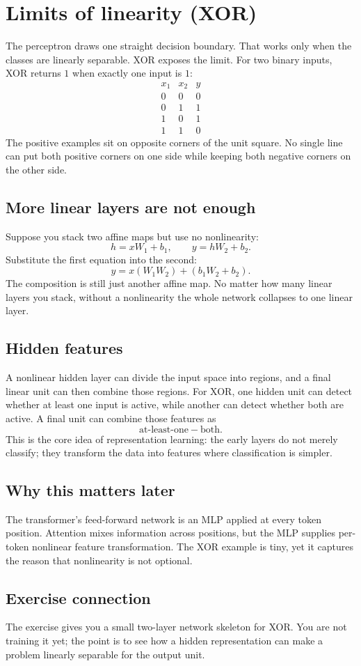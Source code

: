 \section{Limits of linearity (XOR)}\label{sec:02}

The perceptron draws one straight decision boundary. That works only when the
classes are linearly separable. XOR exposes the limit. For two binary inputs,
XOR returns $1$ when exactly one input is $1$:
\[
\begin{array}{ccc}
 x_1 & x_2 & y\\
 0 & 0 & 0\\
 0 & 1 & 1\\
 1 & 0 & 1\\
 1 & 1 & 0
\end{array}
\]
The positive examples sit on opposite corners of the unit square. No single
line can put both positive corners on one side while keeping both negative
corners on the other side.

\subsection*{More linear layers are not enough}
Suppose you stack two affine maps but use no nonlinearity:
\[
  h = xW_1 + b_1,
  \qquad
  y = hW_2 + b_2.
\]
Substitute the first equation into the second:
\[
  y = x(W_1W_2) + (b_1W_2 + b_2).
\]
The composition is still just another affine map. No matter how many linear
layers you stack, without a nonlinearity the whole network collapses to one
linear layer.

\subsection*{Hidden features}
A nonlinear hidden layer can divide the input space into regions, and a
final linear unit can then combine those regions. For XOR, one hidden unit can detect
whether at least one input is active, while another can detect whether both are
active. A final unit can combine those features as
\[
  \text{at-least-one} - \text{both}.
\]
This is the core idea of representation learning: the early layers do not merely
classify; they transform the data into features where classification is simpler.

\subsection*{Why this matters later}
The transformer's feed-forward network is an MLP applied at every token
position. Attention mixes information across positions, but the MLP supplies
per-token nonlinear feature transformation. The XOR example is tiny, yet it
captures the reason that nonlinearity is not optional.

\subsection*{Exercise connection}
The exercise gives you a small two-layer network skeleton for XOR. You are not
training it yet; the point is to see how a hidden representation can make a
problem linearly separable for the output unit.
